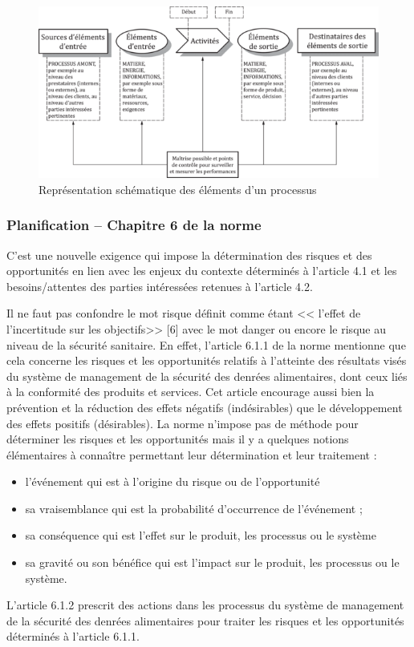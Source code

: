 \begin{spacing}{1.2}
\begin{figure}[!ht]\centering
\includegraphics[scale=9]{image6.png}
\caption{ Représentation schématique des éléments d’un processus }
\label{fig:fig1}
\end{figure}


\subsubsection{Planification – Chapitre 6 de la norme}

C’est une nouvelle exigence qui impose la détermination des risques et des opportunités en lien avec les enjeux du contexte déterminés à l’article 4.1 et les besoins/attentes des parties intéressées retenues à l’article 4.2.

Il ne faut pas  confondre le mot risque définit comme étant << l’effet de l’incertitude sur les objectifs>> [6] avec le mot danger ou encore le risque au niveau de la sécurité sanitaire. En effet, l’article 6.1.1 de la norme mentionne que cela concerne les risques et les opportunités relatifs à l’atteinte des résultats visés du système de management de la sécurité des denrées alimentaires, dont ceux liés à la conformité des produits et services.
 Cet article encourage aussi bien la prévention et la réduction des effets négatifs (indésirables) que le développement des effets positifs (désirables).
La norme n’impose pas de méthode pour déterminer les risques et les opportunités mais il y a quelques notions élémentaires à connaître  permettant leur détermination et leur traitement :

\begin{itemize}
	\item l’événement qui est à l’origine du risque ou de l’opportunité
	\item sa vraisemblance qui est la probabilité d’occurrence de l’événement ;
\item sa conséquence qui est l’effet sur le produit, les processus ou le système
\item sa gravité ou son bénéfice qui est l’impact sur le produit, les processus ou le système.
\end{itemize}


L’article 6.1.2 prescrit des actions dans les processus du système de management de la sécurité des denrées alimentaires pour traiter les risques et les opportunités déterminés à l’article 6.1.1. 
\end{spacing}
